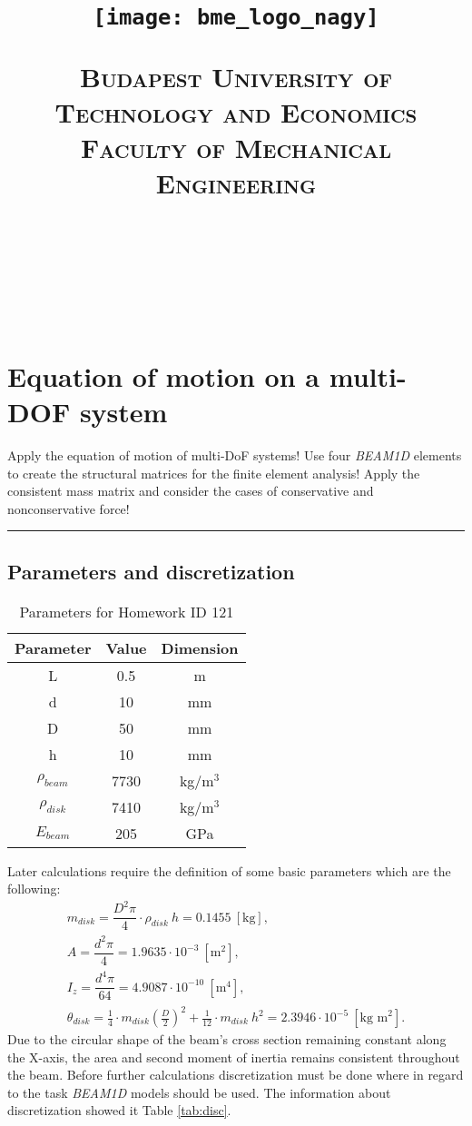 \documentclass[12pt]{article}
\title{\centering \texttt{[image: bme\_logo\_nagy]}
\bigskip

\normalfont \normalsize \textsc{\centering Budapest University of Technology and Economics
\\ Faculty of Mechanical Engineering} \\ [12pt] \horrule{0.5pt} \\[0.4cm] \huge \HFCIME{} \\ \horrule{2pt} \\[0.5cm]}
\author{\NEV{}}
\newcommand*\circled[1]{%
  \tikz[baseline=(char.base)]{%
    \node[shape=circle,draw,inner sep=1pt] (char) {#1};%
  }%
}
\newcommand{\horrule}[1]{\rule{\linewidth}{#1}}
\begin{document}

\pagebreak
\maketitle
\pagebreak

\pagebreak
\tableofcontents
\newpage
\section{Equation of motion on a multi-DOF system}
Apply the equation of motion of multi-DoF systems! Use four \textit{BEAM1D} elements to create the structural matrices for the finite element analysis! Apply the consistent mass matrix and consider the cases of conservative \circled{a.} and nonconservative \circled{b.} force!\\
\horrule{0.4pt}

\subsection{Parameters and discretization}

\begin{table}[htbp]
    \centering
    \caption{Parameters for Homework ID 121}
    \label{tab:parameters-121}
    \begin{tabular}{ccc}
        Parameter & Value & Dimension\\ \hline
        L & 0.5 &m \\
        d & 10 &mm \\
        D & 50 &mm \\
        h & 10 &mm \\
        $\rho_{beam}$ & 7730 &kg/m$^3$ \\
        $\rho_{disk}$ & 7410 &kg/m$^3$ \\
        $E_{beam}$ & 205& GPa
    \end{tabular}
\end{table}

Later calculations require the definition of some basic parameters which are the following:
\begin{gather}
m_{disk} = \dfrac{D^2 \pi}{4} \cdot \rho_{disk} ~ h = 0.1455 ~ \left[ \text{kg} \right], \\
A = \dfrac{d^2 \pi}{4} = 1.9635 \cdot 10^{-3} ~ \left[ \text{m} ^2 \right],\\
I_z = \dfrac{d^4 \pi}{64} = 4.9087 \cdot 10^{-10} ~ \left[ \text{m} ^4 \right], \\
\theta_{disk} = \frac{1}{4} \cdot m_{disk} \left( \frac{D}{2} \right)^2 + \frac{1}{12} \cdot m_{disk} ~ h^2 = 2.3946 \cdot 10^{-5} ~ \left[ \text{kg m} ^2 \right].
\end{gather}
Due to the circular shape of the beam's cross section remaining constant along the X-axis, the area and second moment of inertia remains consistent throughout the beam. Before further calculations discretization must be done where in regard to the task \textit{BEAM1D} models should be used. The information about discretization showed it Table \ref{tab:disc}.
\end{document}
